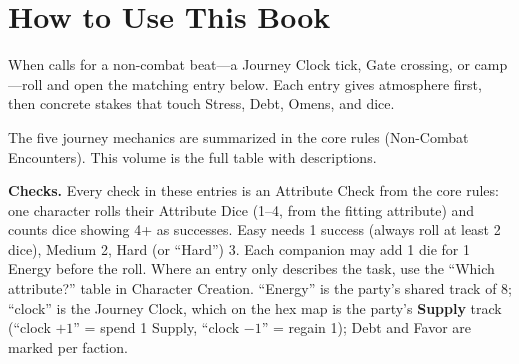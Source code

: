 \documentclass[10pt,a4paper,titlepage,onecolumn]{scrartcl}
\begin{document}


\tableofcontents

\clearpage

\section{How to Use This Book}

When \game{} calls for a non-combat beat---a Journey Clock tick, Gate crossing, or camp---roll  and open the matching entry below.
Each entry gives atmosphere first, then concrete stakes that touch Stress, Debt, Omens, and dice.

The five journey mechanics are summarized in the core rules (Non-Combat Encounters). This volume is the full table with descriptions.

\textbf{Checks.} Every check in these entries is an Attribute Check from the core rules: one character rolls their Attribute Dice (1--4, from the fitting attribute) and counts dice showing 4+ as successes. Easy needs 1 success (always roll at least 2 dice), Medium 2, Hard (or ``Hard'') 3. Each companion may add 1 die for 1 Energy before the roll. Where an entry only describes the task, use the ``Which attribute?'' table in Character Creation. ``Energy'' is the party's shared track of 8; ``clock'' is the Journey Clock, which on the hex map is the party's \textbf{Supply} track (``clock $+1$'' = spend 1 Supply, ``clock $-1$'' = regain 1); Debt and Favor are marked per faction.



\clearpage
\printindex
\end{document}
